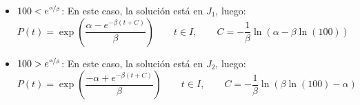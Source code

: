\begin{ejercicio}
\begin{itemize}
        \item \ul{$100<e^{\nicefrac{\alpha}{\beta}}$}: En este caso, la solución está en $J_1$, luego:
        \begin{equation*}
            P(t) = \exp\left(\dfrac{\alpha - e^{-\beta(t + C)}}{\beta}\right) \qquad t\in I, \qquad C=-\dfrac{1}{\beta}\ln(\alpha-\beta\ln(100))
        \end{equation*}

        \item \ul{$100>e^{\nicefrac{\alpha}{\beta}}$}: En este caso, la solución está en $J_2$, luego:
        \begin{equation*}
            P(t) = \exp\left(\dfrac{-\alpha + e^{-\beta(t + C)}}{\beta}\right) \qquad t\in I, \qquad C=-\dfrac{1}{\beta}\ln(\beta\ln(100)-\alpha)
        \end{equation*}
    \end{itemize}

\end{ejercicio}

